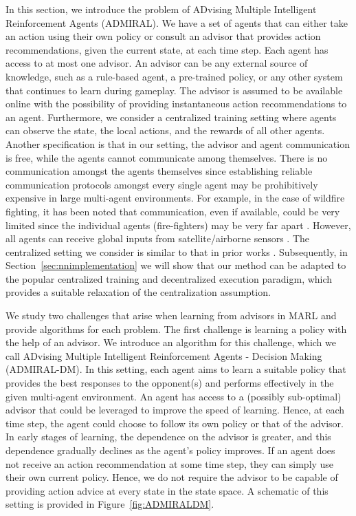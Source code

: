\documentclass[jair, twoside,11pt,theapa]{article}
\begin{document}
In this section, we introduce the problem of ADvising Multiple Intelligent Reinforcement Agents (ADMIRAL). We have a set of agents that can either take an action using their own policy or consult an advisor that provides action recommendations, given the current state,  at each time step. Each agent has access to at most one advisor. An advisor can be any external source of knowledge, such as a rule-based agent, a pre-trained policy, or any other system that continues to learn during gameplay.  The advisor is assumed to be available online with the possibility of providing instantaneous action recommendations to an agent. Furthermore, we consider a centralized training setting where agents can observe the state, the local actions, and the rewards of all other agents. Another specification is that in our setting, the advisor and agent communication is free, while the agents cannot communicate among themselves. There is no communication amongst the agents themselves since establishing reliable communication protocols amongst every single agent may be prohibitively expensive in large multi-agent environments. For example, in the case of wildfire fighting, it has been noted that communication, even if available, could be very limited since the individual agents (fire-fighters) may be very far apart \citep{phan2008cooperative}. However, all agents can receive global inputs from satellite/airborne sensors \citep{leblon2012use}. The centralized setting we consider is similar to that in prior works \citep{hu2003nash}. Subsequently, in Section~\ref{sec:nnimplementation} we will show that our method can be adapted to the popular centralized training and decentralized execution \citep{lowe2017multi} paradigm, which provides a suitable relaxation of the centralization assumption. 


We study two challenges that arise when learning from advisors in MARL and provide algorithms for each problem. 
The first challenge is learning a policy with the help of an advisor. We introduce an algorithm for this challenge, which we call ADvising Multiple Intelligent Reinforcement Agents - Decision Making (ADMIRAL-DM). In this setting, each agent aims to learn a suitable policy that provides the best responses to the opponent(s) and performs effectively in the given multi-agent environment. An agent has access to a (possibly sub-optimal) advisor that could be leveraged to improve the speed of learning. Hence, at each time step, the agent could choose to follow its own policy or that of the advisor. In  early stages of learning, the dependence on the advisor is greater, and this dependence gradually declines  as the agent's policy improves. If an agent does not receive an action recommendation at some time step, they can simply use their own current policy. Hence, we do not require the advisor to be capable of providing action advice at every state in the state space. A schematic of this setting is provided in Figure~\ref{fig:ADMIRALDM}. 
\end{document}
